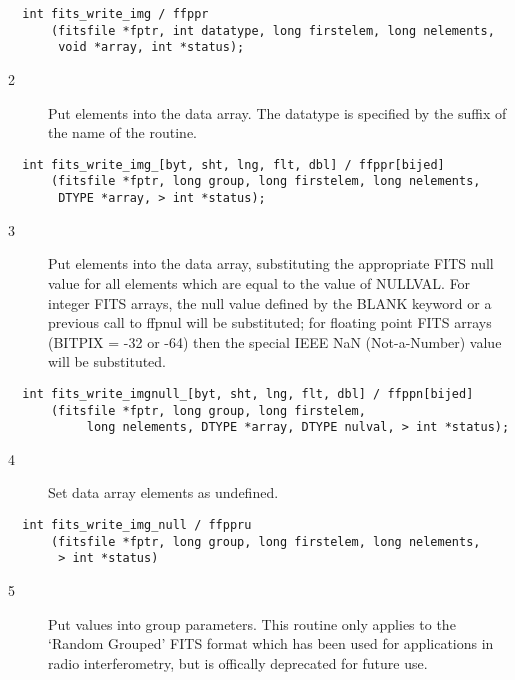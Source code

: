 \begin{verbatim}
  int fits_write_img / ffppr
      (fitsfile *fptr, int datatype, long firstelem, long nelements,
       void *array, int *status);
\end{verbatim}

\begin{description}
\item[2 ] Put elements into the data array.  The datatype is specified
   by the suffix of the name of the routine.
\end{description}

\begin{verbatim}
  int fits_write_img_[byt, sht, lng, flt, dbl] / ffppr[bijed]
      (fitsfile *fptr, long group, long firstelem, long nelements,
       DTYPE *array, > int *status);
\end{verbatim}

\begin{description}
\item[3 ]Put elements into the data array, substituting the appropriate FITS null
   value for all elements which are equal to the value of NULLVAL.  For
   integer FITS arrays, the null value defined by the BLANK keyword or
   a previous call to ffpnul
   will be substituted;  for floating point FITS arrays (BITPIX = -32
   or -64) then the special IEEE NaN (Not-a-Number) value will be
  substituted.
\end{description}

\begin{verbatim}
  int fits_write_imgnull_[byt, sht, lng, flt, dbl] / ffppn[bijed]
      (fitsfile *fptr, long group, long firstelem,
           long nelements, DTYPE *array, DTYPE nulval, > int *status);
\end{verbatim}

\begin{description}
\item[4 ]Set data array elements as undefined.
\end{description}

\begin{verbatim}
  int fits_write_img_null / ffppru
      (fitsfile *fptr, long group, long firstelem, long nelements,
       > int *status)
\end{verbatim}

\begin{description}
\item[5 ] Put values into group parameters.  This routine only applies
    to the `Random Grouped' FITS format which has been used for
    applications in radio interferometry, but is offically deprecated
   for future use.
\end{description}

